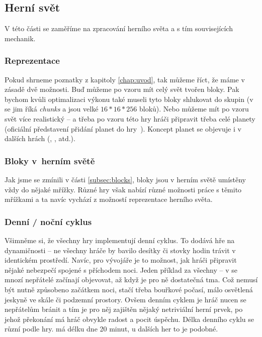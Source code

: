 \subsection{Herní svět}

V této části se zaměříme na zpracování herního světa a s tím souvisejících mechanik.

\subsubsection{Reprezentace}

Pokud shrneme poznatky z kapitoly \ref{chap:uvod}, tak můžeme říct, že máme v zásadě dvě možnosti. Buď můžeme po vzoru \MC{} mít celý svět tvořen bloky. Pak bychom kvůli optimalizaci výkonu také museli tyto bloky shlukovat do skupin (v  se jim říká \textit{chunks} a jsou velké $16*16*256$ bloků). Nebo můžeme mít po vzoru \SE{} svět více realistický -- a třeba po vzoru této hry hráči připravit třeba celé planety (oficiální představení přidání planet do hry~\citep{se_planets}). Koncept planet se objevuje i v dalších hrách (\ME{}, \NMS{}, atd.).

\subsubsection{Bloky v~herním světě}

Jak jsme se zmínili v části \ref{subsec:blocks}, bloky jsou v herním světě umístěny vždy do nějaké mřížky. Různé hry však nabízí různé možnosti práce s těmito mřížkami a ta navíc vychází z možností reprezentace herního světa.


\subsubsection{Denní / noční cyklus}

Všimněme si, že všechny hry implementují denní cyklus. To dodává hře na dynamičnosti -- ne všechny hráče by bavilo desítky či stovky hodin trávit v identickém prostředí. Navíc, pro vývojáře je to možnost, jak hráči připravit nějaké nebezpečí spojené s příchodem noci. Jeden příklad za všechny -- v  se mnozí nepřátelé začínají objevovat, až když je pro ně dostatečná tma. Což nemusí být nutně způsobeno začátkem noci, stačí třeba bouřkové počasí, málo osvětlená jeskyně ve skále či podzemní prostory. Ovšem denním cyklem je hráč nucen se nepřátelům bránit a tím je pro něj zajištěn nějaký netriviální herní prvek, po jehož překonání má hráč obvykle radost a pocit úspěchu.
Délka denního cyklu se různí podle hry. \MC{} má délku dne 20 minut, u dalších her to je podobné.


